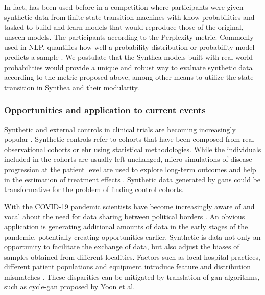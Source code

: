In fact, has been used before in a competition where participants were given synthetic data from finite state transition machines with know probabilities and tasked to build and learn models that would reproduce those of the original, unseen models. The participants according to the Perplexity metric. Commonly used in NLP, quantifies how well a probability distribution or probability model predicts a sample \cite{Verwer_2013}. We postulate that the Synthea models built with real-world probabilities would provide a unique and robust way to evaluate synthetic data according to the metric proposed above, among other means to utilize the state-transition in Synthea and their modularity.

\subsubsection{Opportunities and application to current events}
Synthetic and external controls in clinical trials are becoming increasingly popular \cite{Thorlund2020}. Synthetic controls refer to cohorts that have been composed from real observational cohorts or \gls{ehr} using statistical methodologies. While the individuals included in the cohorts are usually left unchanged, micro-simulations of disease progression at the patient level are used to explore long-term outcomes and help in the estimation of treatment effects \cite{Thorlund2020, Etzioni2002}. Synthetic data generated by \glspl{gan} could be transformative for the problem of finding control cohorts.\par
With the COVID-19 pandemic scientists have become increasingly aware of and vocal about the need for data sharing between political borders \cite{Cosgriff_2020,Becker_2020,McLennan_2020}. An obvious application is generating additional amounts of data in the early stages of the pandemic, potentially creating opportunities earlier. Synthetic is data not only an opportunity to facilitate the exchange of data, but also adjust the biases of samples obtained from different localities. Factors such as local hospital practices, different patient populations and equipment introduce feature and distribution mismatches \cite{Ghassemi2020}. These disparities can be mitigated by translation of \gls{gan} algorithms, such as \gls{cycle-gan} proposed by Yoon et al.
